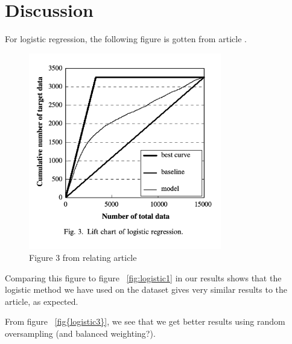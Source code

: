 \section{Discussion}

For logistic regression, the following figure is gotten from 
article \cite{ComparisonData}. 

\begin{figure}[H]
\begin{center}
    \includegraphics[width=0.75\textwidth, height=0.5\textheight]{figures/logistic_article.png}
\end{center}
\caption[caption]{Figure 3 from relating article ~\cite{ComparisonData}}
\end{figure}

Comparing this figure to figure ~\ref{fig:logistic1} in our 
results shows that the logistic method we have used on the 
dataset gives very similar results to the article, as expected. 

From figure ~\ref{fig{logistic3}}, we see that we get 
better results using random oversampling (and balanced weighting?). 


